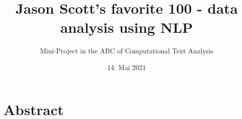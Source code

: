 \title{Jason Scott's favorite 100 - data analysis using NLP}
\subtitle{Mini-Project in the ABC of Computational Text Analysis}
\date{\small{14. Mai 2021}}
\maketitle

\section*{Abstract}


\setcounter{tocdepth}{3}
\tableofcontents

\newpage
{}